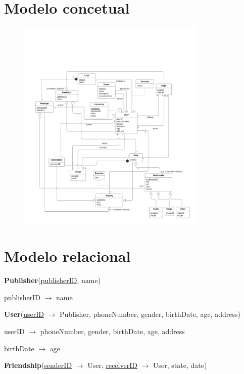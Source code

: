 \documentclass[12pt]{report}
\begin{document}
\chapter{Modelo concetual}

\begin{figure}[h!]
    \centering
    \includegraphics[width=0.8\textwidth]{diagram}
\end{figure}

\chapter{Modelo relacional}

\textbf{Publisher}(\underline{publisherID}, name)

publisherID $\rightarrow$ name

\vspace{2mm}

\textbf{User}(\underline{userID} $\rightarrow$ Publisher, phoneNumber, gender, birthDate, age, address)

userID $\rightarrow$ phoneNumber, gender, birthDate, age, address

birthDate $\rightarrow$ age

\vspace{2mm}

\textbf{Friendship}(\underline{senderID} $\rightarrow$ User, \underline{receiverID} $\rightarrow$ User, state, date)
\end{document}

